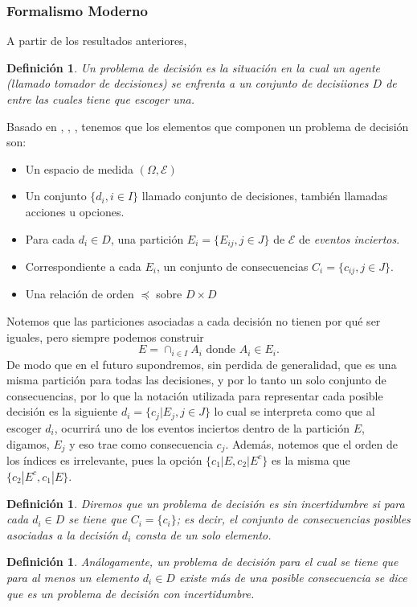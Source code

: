 \documentclass[11pt]{article}
\theoremstyle{plain}
\newtheorem{defi}[teo]{Definición}
\begin{document}
\subsubsection{Formalismo Moderno}
A partir de los resultados anteriores,
\begin{defi}
Un problema de decisión es la situación en la cual un agente (llamado tomador de decisiones) se enfrenta a un conjunto de decisiiones $D$ de entre las cuales tiene que escoger una.
\end{defi}
Basado en \cite{Bernardo1985}, \cite{bernardo2000bayesian}, \cite{gilboa2009decision}, tenemos que los elementos que componen un problema de decisión son:
\begin{itemize}
\item Un espacio de medida $(\Omega, \mathcal{E})$
\item Un conjunto $\{d_i, i \in I\}$ llamado conjunto de decisiones, también llamadas acciones u opciones.
\item Para cada $d_i \in D$, una partición $E_i= \{E_{ij}, j \in J \}$ de $\mathcal{E}$ de \textit{eventos inciertos}.
\item Correspondiente a cada $E_i$, un conjunto de consecuencias $C_i = \{ c_{ij}, j \in J \}$.
\item Una relación de orden $\preceq$ sobre $D \times D$
\end{itemize}
Notemos que las particiones asociadas a cada decisión no tienen por qué ser iguales, pero siempre podemos construir
\[ E = \cap_{i \in I} A_i \textrm{ donde } A_i \in E_i. \]
De modo que en el futuro supondremos, sin perdida de generalidad, que es una misma partición para todas las decisiones, y por lo tanto un solo conjunto de consecuencias, por lo que la notación utilizada para representar cada posible decisión es la siguiente $d_i = \{ c_j | E_j, j \in J\}$ lo cual se interpreta como que al escoger $d_i$, ocurrirá uno de los eventos inciertos dentro de la partición $E$, digamos, $E_j$ y eso trae como consecuencia $c_j$. Además, notemos que el orden de los índices es irrelevante, pues la opción $\{ c_1 | E, c_2 | E^c \}$ es la misma que $\{ c_2 | E^c, c_1 | E \}$.
\begin{defi}
Diremos que un problema de decisión es sin incertidumbre si para cada $d_i \in D$ se tiene que $C_i = \{c_i\}$; es decir,  el conjunto de consecuencias posibles  asociadas a la decisión $d_i$ consta de un solo elemento.
\end{defi}
\begin{defi}
Análogamente, un problema de decisión para el cual se tiene que para al menos un elemento $d_i \in D$ existe más de una posible consecuencia se dice que es un problema de decisión con incertidumbre.
\end{defi}
\end{document}
